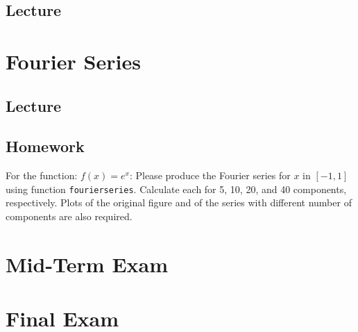 \documentclass[a4paper]{book}
\begin{document}
\section{Lecture}




\chapter{Fourier Series}
\section{Lecture}

\section{Homework}
For the function: $f(x) = e^x$:
Please produce the Fourier series for $x$ in $[-1, 1]$ using function {\tt fourierseries}.
Calculate each for 5, 10, 20, and 40 components, respectively.
Plots of the original figure and of the series with different number of components are also required.



\appendix
\chapter{Mid-Term Exam}



\chapter{Final Exam}

\end{document}
